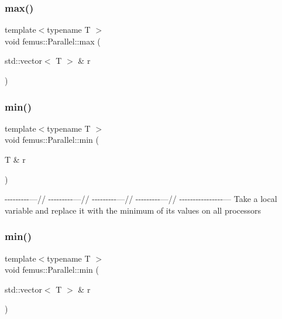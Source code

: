 \mbox{\label{namespacefemus_1_1_parallel_ae4d2a186c227f0dfd057767cbd158a7f}} 
\subsubsection{\texorpdfstring{max()}{max()}\hspace{0.1cm}{\footnotesize\ttfamily [2/2]}}
{\footnotesize\ttfamily template$<$typename T $>$ \\
void femus\+::\+Parallel\+::max (\begin{DoxyParamCaption}\item[{std\+::vector$<$ T $>$ \&}]{r }\end{DoxyParamCaption})\hspace{0.3cm}{\ttfamily [inline]}}

\mbox{\label{namespacefemus_1_1_parallel_a63e5f0fd22309cacacb73e7dfd3256df}} 
\subsubsection{\texorpdfstring{min()}{min()}\hspace{0.1cm}{\footnotesize\ttfamily [1/2]}}
{\footnotesize\ttfamily template$<$typename T $>$ \\
void femus\+::\+Parallel\+::min (\begin{DoxyParamCaption}\item[{T \&}]{r }\end{DoxyParamCaption})\hspace{0.3cm}{\ttfamily [inline]}}

-\/-\/-\/-\/-\/-\/-\/-\/-\/---// -\/-\/-\/-\/-\/-\/-\/-\/-\/---// -\/-\/-\/-\/-\/-\/-\/-\/-\/---// -\/-\/-\/-\/-\/-\/-\/-\/-\/---// -\/-\/-\/-\/-\/-\/-\/-\/-\/-\/-\/-\/-\/-\/-\/-\/--- Take a local variable and replace it with the minimum of it\textquotesingle{}s values on all processors \mbox{\label{namespacefemus_1_1_parallel_adb06087f16bb1136a2c2c1465f07fbcd}} 
\subsubsection{\texorpdfstring{min()}{min()}\hspace{0.1cm}{\footnotesize\ttfamily [2/2]}}
{\footnotesize\ttfamily template$<$typename T $>$ \\
void femus\+::\+Parallel\+::min (\begin{DoxyParamCaption}\item[{std\+::vector$<$ T $>$ \&}]{r }\end{DoxyParamCaption})\hspace{0.3cm}{\ttfamily [inline]}}


